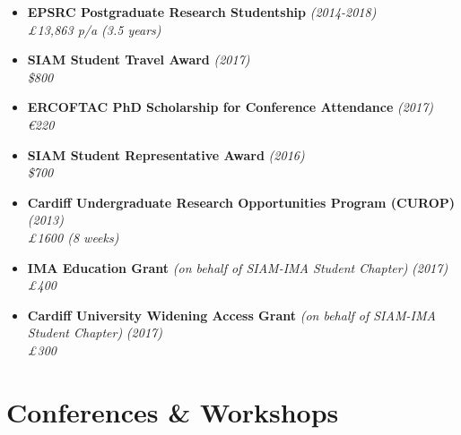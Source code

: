 \documentclass[11pt,a4paper,sans]{moderncv}        %
\begin{document}
\begin{itemize}

\item \textbf{EPSRC Postgraduate Research Studentship} \textit{(2014-2018)} \\
\textit{£13,863 p/a (3.5 years)}

\vspace{6pt}

\item \textbf{SIAM Student Travel Award} \textit{(2017)}\\
\textit{\$800}

\vspace{6pt}

\item \textbf{ERCOFTAC PhD Scholarship for Conference Attendance} \textit{(2017)}\\
\textit{\euro{}220}

\vspace{6pt}

\item \textbf{SIAM Student Representative Award} \textit{(2016)}\\
\textit{\$700}

\vspace{6pt}

\item \textbf{Cardiff Undergraduate Research Opportunities Program (CUROP)} \textit{(2013)} \\
\textit{£1600 (8 weeks)}

\vspace{6pt}

\item \textbf{IMA Education Grant} \textit{(on behalf of SIAM-IMA Student Chapter)} \textit{(2017)}\\
\textit{£400}

\vspace{6pt}

\item \textbf{Cardiff University Widening Access Grant} \textit{(on behalf of SIAM-IMA Student Chapter)} \textit{(2017)}\\
\textit{£300}

\vspace{6pt}

\end{itemize}

\section{Conferences \& Workshops}
\end{document}
